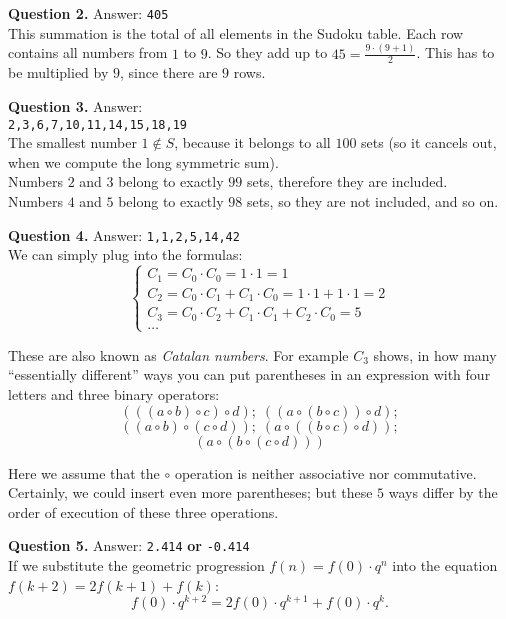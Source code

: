 \documentclass[jou]{apa6}
\begin{document}
\vspace{6pt}
{\bf Question 2.} Answer: {\tt 405}\\
This summation is the total of all elements in the Sudoku table. 
Each row contains all numbers from $1$ to $9$. So they add up to 
$45 = \frac{9 \cdot (9+1)}{2}$. This has to be multiplied by $9$, since
there are $9$ rows. 

\vspace{6pt}
{\bf Question 3.} Answer:\\ {\tt 2,3,6,7,10,11,14,15,18,19}\\
The smallest number $1 \not\in S$, because it belongs to all $100$ sets (so it cancels out, when 
we compute the long symmetric sum).\\
Numbers $2$ and $3$ belong to exactly $99$ sets, therefore they are included.\\
Numbers $4$ and $5$ belong to exactly $98$ sets, so they are not included, and so on. 



\vspace{6pt}
{\bf Question 4.} Answer: {\tt 1,1,2,5,14,42}\\
We can simply plug into the formulas: 
$$\left\{ \begin{array}{l}
C_1 = C_0 \cdot C_0 = 1 \cdot 1 = 1\\
C_2 = C_0 \cdot C_1 + C_1 \cdot C_0 = 1 \cdot 1 + 1 \cdot 1 = 2\\
C_3 = C_0 \cdot C_2 + C_1 \cdot C_1 + C_2 \cdot C_0 = 5\\
\ldots
\end{array} \right.$$

These are also known as {\em Catalan numbers}. 
For example $C_3$ shows, in how many ``essentially different'' ways you can put parentheses
in an expression with four letters and three binary operators:
$$(((a \circ b) \circ c) \circ d);\; ((a \circ (b \circ c)) \circ d);$$
$$((a \circ b) \circ (c \circ d));\; (a \circ ((b \circ c) \circ d));$$ 
$$(a \circ (b \circ (c \circ d)))$$

Here we assume that the $\circ$ operation is neither associative nor commutative. 
Certainly, we could insert even more parentheses; but these $5$ ways differ 
by the order of execution of these three operations.



\vspace{6pt}
{\bf Question 5.} Answer: {\tt 2.414} {\bf or} {\tt -0.414}\\
If we substitute the geometric progression $f(n) = f(0) \cdot q^n$ 
into the equation $f(k+2) = 2f(k+1) + f(k)$: 
$$f(0) \cdot q^{k+2} = 2f(0) \cdot q^{k+1} + f(0) \cdot q^{k}.$$
\end{document}
